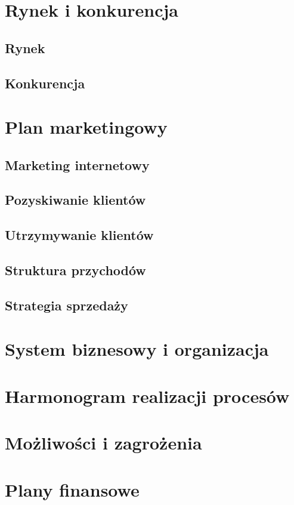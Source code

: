 \documentclass[12pt]{article}
\begin{document}
\section{Rynek i konkurencja}
\subsection{Rynek}
\subsection{Konkurencja}

\section{Plan marketingowy}
\subsection{Marketing internetowy}
\subsection{Pozyskiwanie klientów}
\subsection{Utrzymywanie klientów}
\subsection{Struktura przychodów}
\subsection{Strategia sprzedaży}

\section{System biznesowy i organizacja}

\section{Harmonogram realizacji procesów}

\section{Możliwości i zagrożenia}

\section{Plany finansowe}
\end{document}
